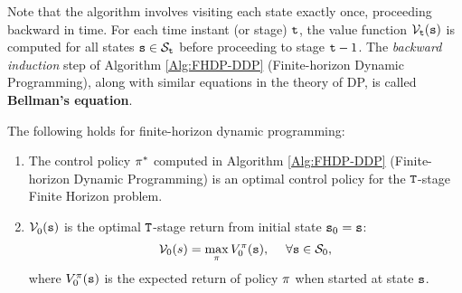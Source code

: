 Note that the algorithm involves visiting each state exactly once, proceeding
backward in time. For each time instant (or stage) ${\tt t}$, the
value function ${\mathcal{V}_{{\tt t}}}({\tt s})$ is computed for all
states ${\tt s} \in {\mathcal{S}_{{\tt t}}}$ before proceeding to stage
${\tt t} - 1$. The {\em backward induction} step of Algorithm \ref{Alg:FHDP-DDP} (Finite-horizon Dynamic Programming),
along with similar equations in the theory of DP, is called
\textbf{Bellman's equation}.

\begin{proposition}
The following holds for finite-horizon dynamic programming:
\begin{enumerate}
  \item
The control policy $\pi^* $ computed in Algorithm
\ref{Alg:FHDP-DDP} (Finite-horizon Dynamic Programming) is an optimal control policy for the
${\tt T}$-stage Finite Horizon problem.
  \item $\mathcal{V}_0^{}({\tt s})$ is the optimal ${\tt T}$-stage return from initial state ${{\tt s}_0} = {\tt s}$:
\[{\mathcal{V}_0}(s) = \mathop {\max }\limits_\pi  {V^\pi_0}({\tt s}),\;\quad \forall {\tt s} \in {\mathcal{S}_0},\]
where $V^\pi_0({\tt s})$ is the expected return of policy $\pi$
when started at state ${\tt s}$.
\end{enumerate}
\end{proposition}

